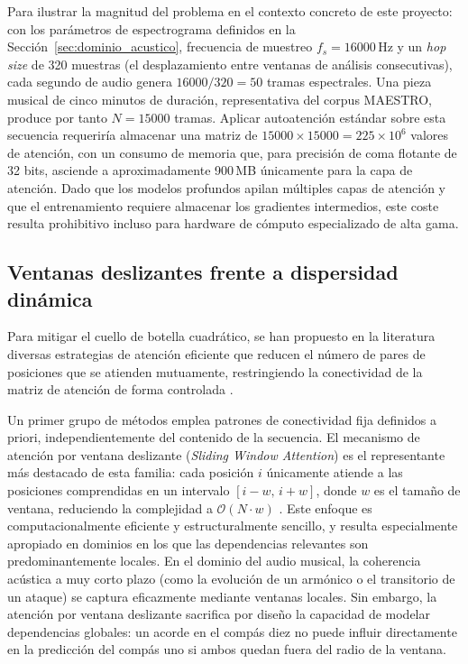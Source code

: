 Para ilustrar la magnitud del problema en el contexto concreto de este
proyecto: con los parámetros de espectrograma definidos en la
Sección~\ref{sec:dominio_acustico}, frecuencia de muestreo
$f_s = 16000\,\mathrm{Hz}$ y un \textit{hop size} de 320 muestras
(el desplazamiento entre ventanas de análisis consecutivas), cada
segundo de audio genera $16000 / 320 = 50$ tramas espectrales. Una
pieza musical de cinco minutos de duración, representativa del corpus
MAESTRO, produce por tanto $N = 15000$ tramas. Aplicar autoatención
estándar sobre esta secuencia requeriría almacenar una matriz de
$15000 \times 15000 = 225 \times 10^6$ valores de atención, con un
consumo de memoria que, para precisión de coma flotante de 32 bits,
asciende a aproximadamente 900\,MB únicamente para la capa de atención.
Dado que los modelos profundos apilan múltiples capas de atención y que
el entrenamiento requiere almacenar los gradientes intermedios, este
coste resulta prohibitivo incluso para hardware de cómputo especializado
de alta gama.

\subsection{Ventanas deslizantes frente a dispersidad dinámica}

Para mitigar el cuello de botella cuadrático, se han propuesto en la
literatura diversas estrategias de atención eficiente que reducen el
número de pares de posiciones que se atienden mutuamente, restringiendo
la conectividad de la matriz de atención de forma controlada
\cite{tay2020efficient}.

Un primer grupo de métodos emplea patrones de conectividad fija definidos
a priori, independientemente del contenido de la secuencia. El mecanismo
de atención por ventana deslizante (\textit{Sliding Window Attention})
es el representante más destacado de esta familia: cada posición $i$
únicamente atiende a las posiciones comprendidas en un intervalo
$[i - w,\, i + w]$, donde $w$ es el tamaño de ventana, reduciendo la
complejidad a $\mathcal{O}(N \cdot w)$ \cite{beltagy2020longformer}. Este
enfoque es computacionalmente eficiente y estructuralmente sencillo, y
resulta especialmente apropiado en dominios en los que las dependencias
relevantes son predominantemente locales. En el dominio del audio musical,
la coherencia acústica a muy corto plazo (como la evolución de un
armónico o el transitorio de un ataque) se captura eficazmente mediante
ventanas locales. Sin embargo, la atención por ventana deslizante
sacrifica por diseño la capacidad de modelar dependencias globales: un
acorde en el compás diez no puede influir directamente en la predicción
del compás uno si ambos quedan fuera del radio de la ventana.

